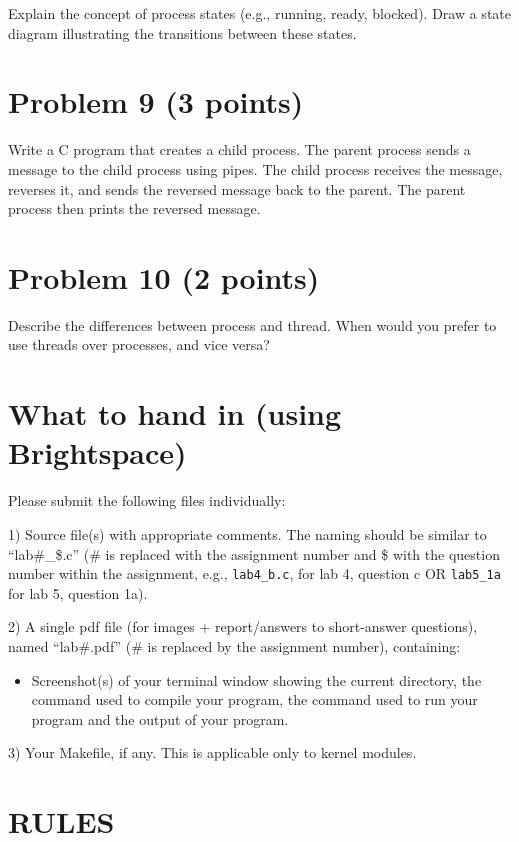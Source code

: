 \documentclass{article}
\begin{document}
Explain the concept of process states (e.g., running, ready, blocked).  Draw a state diagram illustrating the transitions between these states.


\section*{Problem 9 (3 points)}

Write a C program that creates a child process. The parent process sends a message to the child process using pipes. The child process receives the message, reverses it, and sends the reversed message back to the parent. The parent process then prints the reversed message.


\section*{Problem 10 (2 points)}

Describe the differences between process and thread.  When would you prefer to use threads over processes, and vice versa?


\section*{What to hand in (using Brightspace)}

Please submit the following files individually:

1) Source file(s) with appropriate comments. The naming should be similar to “lab\#\_\$.c” (\# is replaced with the assignment number and \$ with the question number within the assignment, e.g., \texttt{lab4\_b.c}, for lab 4, question c OR \texttt{lab5\_1a} for lab 5, question 1a).

2) A single pdf file (for images + report/answers to short-answer questions), named “lab\#.pdf” (\# is replaced by the assignment number), containing:
\begin{itemize}
    \item Screenshot(s) of your terminal window showing the current directory, the command used to compile your program, the command used to run your program and the output of your program.
\end{itemize}

3) Your Makefile, if any. This is applicable only to kernel modules.


\section*{RULES}
\end{document}
